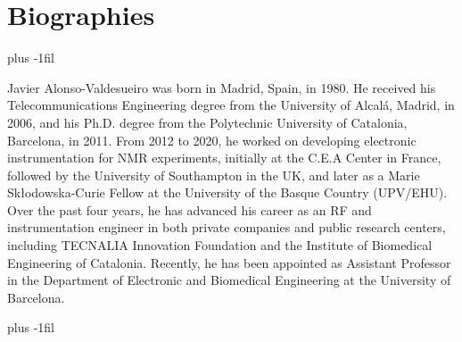 \documentclass[lettersize,journal]{IEEEtran}
\begin{document}






\section{Biographies}
\baselineskip plus -1fil
\begin{IEEEbiography}{Javier Alonso-Valdesueiro} was born in Madrid, Spain, in 1980. He received his Telecommunications Engineering degree from the University of Alcalá, Madrid, in 2006, and his Ph.D. degree from the Polytechnic University of Catalonia, Barcelona, in 2011. From 2012 to 2020, he worked on developing electronic instrumentation for NMR experiments, initially at the C.E.A Center in France, followed by the University of Southampton in the UK, and later as a Marie Skłodowska-Curie Fellow at the University of the Basque Country (UPV/EHU). Over the past four years, he has advanced his career as an RF and instrumentation engineer in both private companies and public research centers, including TECNALIA Innovation Foundation and the Institute of Biomedical Engineering of Catalonia. Recently, he has been appointed as Assistant Professor in the Department of Electronic and Biomedical Engineering at the University of Barcelona.
\end{IEEEbiography}
\baselineskip plus -1fil
\vfill
\end{document}
